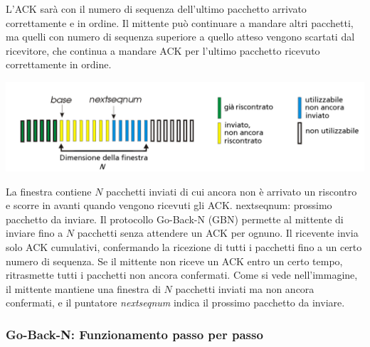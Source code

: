 L'ACK sarà con il numero di sequenza dell'ultimo pacchetto arrivato correttamente e in ordine. Il mittente può continuare a mandare altri pacchetti, ma quelli con numero di sequenza superiore a quello atteso vengono scartati dal ricevitore, che continua a mandare ACK per l'ultimo pacchetto ricevuto correttamente in ordine.

\begin{center}
  \includegraphics[width=\textwidth]{./img/gobackn.png}
\end{center}

La finestra contiene $N$ pacchetti inviati di cui ancora non è arrivato un riscontro e scorre in avanti quando vengono ricevuti gli ACK.
nextseqnum: prossimo pacchetto da inviare.
Il protocollo Go-Back-N (GBN) permette al mittente di inviare fino a $N$ pacchetti senza attendere un ACK per ognuno. Il ricevente invia solo ACK cumulativi, confermando la ricezione di tutti i pacchetti fino a un certo numero di sequenza. Se il mittente non riceve un ACK entro un certo tempo, ritrasmette tutti i pacchetti non ancora confermati. Come si vede nell'immagine, il mittente mantiene una finestra di $N$ pacchetti inviati ma non ancora confermati, e il puntatore \textit{nextseqnum} indica il prossimo pacchetto da inviare.

\subsubsection*{Go-Back-N: Funzionamento passo per passo}

